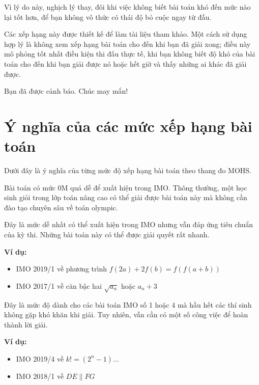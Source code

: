 \documentclass[../imo-training-open-book.tex]{subfiles}
\begin{document}
Vì lý do này, nghịch lý thay, đôi khi việc không biết bài toán khó đến mức nào lại tốt hơn,
để bạn không vô thức có thái độ bỏ cuộc ngay từ đầu.

Các xếp hạng này được thiết kế để làm tài liệu tham khảo. Một cách sử dụng hợp lý là không xem xếp hạng bài toán cho đến khi bạn đã giải xong;
điều này mô phỏng tốt nhất điều kiện thi đấu thực tế,
khi bạn không biết độ khó của bài toán cho đến khi bạn giải được nó hoặc hết giờ và thấy những ai khác đã giải được.

Bạn đã được cảnh báo. Chúc may mắn!

\section*{Ý nghĩa của các mức xếp hạng bài toán}

Dưới đây là ý nghĩa của từng mức độ xếp hạng bài toán theo thang đo MOHS.

\begin{definition*}[0M] \label{definition:0M}
    Bài toán có mức 0M quá dễ để xuất hiện trong IMO.
    Thông thường, một học sinh giỏi trong lớp toán nâng cao có thể giải được bài toán này mà không cần đào tạo chuyên sâu về toán olympic.
\end{definition*}

\begin{definition*}[5M] \label{definition:5M}
    Đây là mức dễ nhất có thể xuất hiện trong IMO nhưng vẫn đáp ứng tiêu chuẩn của kỳ thi. Những bài toán này có thể được giải quyết rất nhanh.

    \textbf{Ví dụ:}
    \begin{itemize}[topsep=0pt, partopsep=0pt, itemsep=0pt]
        \item IMO 2019/1 về phương trình $f(2a) + 2f(b) = f(f(a + b))$
        \item IMO 2017/1 về căn bậc hai $\sqrt{a_n}$ hoặc $a_n + 3$
    \end{itemize}
\end{definition*}

\begin{definition*}[10M] \label{definition:10M}
    Đây là mức độ dành cho các bài toán IMO số 1 hoặc 4 mà hầu hết các thí sinh không gặp khó khăn khi giải. Tuy nhiên, vẫn cần có một số công việc để hoàn thành lời giải.

    \textbf{Ví dụ:}
    \begin{itemize}[topsep=0pt, partopsep=0pt, itemsep=0pt]
        \item IMO 2019/4 về $k! = (2^n-1)\ldots$
        \item IMO 2018/1 về $DE \parallel FG$
    \end{itemize}
\end{definition*}
\end{document}
